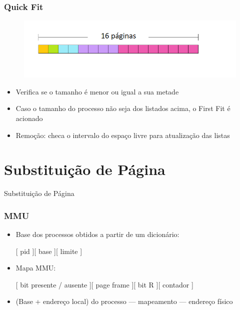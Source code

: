 \documentclass{beamer}
\begin{document}
\begin{frame}
\frametitle{Quick Fit}

\begin{figure}
\centering
\includegraphics[scale=0.6]{imagem4.png}
\end{figure}

\begin{itemize}

\item Verifica se o tamanho é menor ou igual a sua metade

\item Caso o tamanho do processo não seja dos listados acima, o First Fit é acionado

\item Remoção: checa o intervalo do espaço livre para atualização das listas

\end{itemize}

\justifying
\end{frame}



\section{Substituição de Página}
\begin{frame}
\begin{LARGE}
\begin{center}
Substituição de Página
\end{center}
\end{LARGE}
\end{frame}

\begin{frame}
\frametitle{MMU}
\begin{itemize}

\item Base dos processos obtidos a partir de um dicionário: 

[ pid ][ base ][ limite ]

\item Mapa MMU: 
 
[ bit presente / ausente ][ page frame ][ bit R ][ contador ]

\item (Base + endereço local) do processo --- mapeamento --- endereço físico

\end{itemize}
\justifying
\end{frame}
\end{document}
